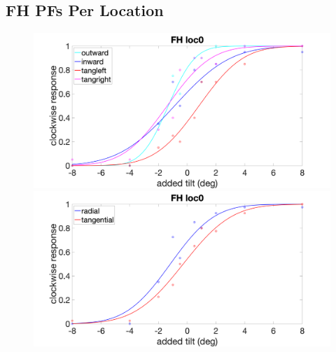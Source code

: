 \documentclass[11pt]{article} %
\begin{document}
\subsection{FH PFs Per Location}
\begin{figure}[H]
\centering %
\includegraphics[scale=.15]{Images/FH_PF_loc0_4conds.png}
\includegraphics[scale=.15]{Images/FH_PF_loc0_2conds.png}
\end{figure}
\end{document}
